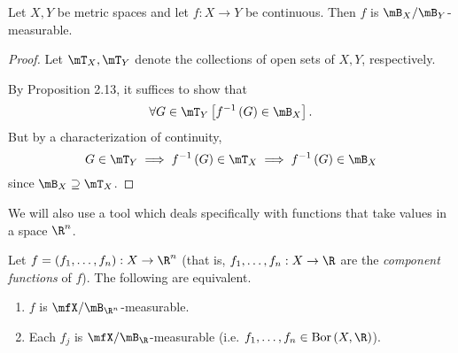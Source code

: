 \documentclass[pmath450]{subfiles}
\begin{document}
    \begin{cor}{}
        Let $X,Y$ be metric spaces and let $f:X\to Y$ be continuous. Then $f$ is $\mB_X /\mB_Y$-measurable.
    \end{cor}	

    \begin{proof}
        Let $\mT_X,\mT_Y$ denote the collections of open sets of $X,Y$, respectively.
        
        By Proposition 2.13, it suffices to show that
        \begin{equation*}
            \forall G\in\mT_Y\left[ f^{-1}\left( G \right)\in\mB_X \right].
        \end{equation*}
        But by a characterization of continuity,
        \begin{equation*}
            G\in\mT_Y\implies f^{-1}\left( G \right)\in\mT_X\implies f^{-1}\left( G \right)\in\mB_X
        \end{equation*}
        since $\mB_X\supseteq\mT_X$.
    \end{proof}

    \np We will also use a tool which deals specifically with functions that take values in a space $\R^n$. 

    \begin{prop}{}
        Let $f=\left( f_1,\ldots,f_n \right):X\to\R^n$ (that is, $f_1,\ldots,f_n:X\to\R$ are the \textit{component functions} of $f$). The following are equivalent.
        \begin{enumerate}
            \item $f$ is $\mfX /\mB_{\R^n}$-measurable.
            \item Each $f_j$ is $\mfX /\mB_{\R}$-measurable (i.e. $f_1,\ldots,f_n\in\bor\left( X,\R \right)$).
        \end{enumerate}
    \end{prop}
\end{document}
